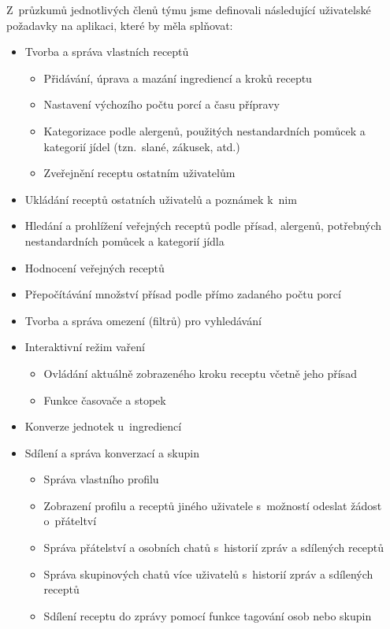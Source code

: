 \documentclass[a4paper, 11pt]{article}
\begin{document}
    Z~průzkumů jednotlivých členů týmu jsme definovali následující uživatelské požadavky na aplikaci,
    které by měla splňovat:
    \begin{itemize}
        \item Tvorba a správa vlastních receptů
        \begin{itemize}[topsep=0em]
            \item Přidávání, úprava a mazání ingrediencí a kroků receptu
            \item Nastavení výchozího počtu porcí a času přípravy
            \item Kategorizace podle alergenů, použitých nestandardních
            pomůcek a kategorií jídel (tzn.\ slané, zákusek, atd.)
            \item Zveřejnění receptu ostatním uživatelům
        \end{itemize}

        \item Ukládání receptů ostatních uživatelů a poznámek k~nim

        \item Hledání a prohlížení veřejných receptů podle přísad,
        alergenů, potřebných nestandardních pomůcek a kategorií jídla

        \item Hodnocení veřejných receptů

        \item Přepočítávání množství přísad podle přímo zadaného počtu porcí

        \item Tvorba a správa omezení (filtrů) pro vyhledávání

        \item Interaktivní režim vaření
        \begin{itemize}[topsep=0em]
            \item Ovládání aktuálně zobrazeného kroku receptu včetně jeho přísad
            \item Funkce časovače a stopek
        \end{itemize}

        \item Konverze jednotek u~ingrediencí

        \item Sdílení a správa konverzací a skupin
        \begin{itemize}[topsep=0em]
            \item Správa vlastního profilu
            \item Zobrazení profilu a receptů jiného uživatele s~možností odeslat žádost o~přáteltví
            \item Správa přátelství a osobních chatů s~historií zpráv a sdílených receptů
            \item Správa skupinových chatů více uživatelů s~historií zpráv a sdílených receptů
            \item Sdílení receptu do zprávy pomocí funkce tagování osob nebo skupin 
        \end{itemize}

    \end{itemize}
\end{document}
